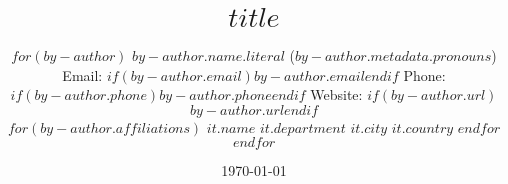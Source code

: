 \title{ \vspace{-1.5em}
\bf $title$ \vspace{-.5em}
}
\author{
  $for(by-author)$
    {$by-author.name.literal$}\:
    ($by-author.metadata.pronouns$)
    \authorcr %
    Email: $if(by-author.email)$\href{mailto:$by-author.email$}{$by-author.email$}$endif$\:
    Phone: $if(by-author.phone)${$by-author.phone$}{}$endif$
    \authorcr
    Website: $if(by-author.url)$\href{$by-author.url$}{$by-author.url$}$endif$
    

    $for(by-author.affiliations)$
      $it.name$
      \authorcr
      $it.department$
      \authorcr
      $it.city$ $it.country$
    $endfor$
  $endfor$
  \date{\vspace{-1em}\today}
  }



